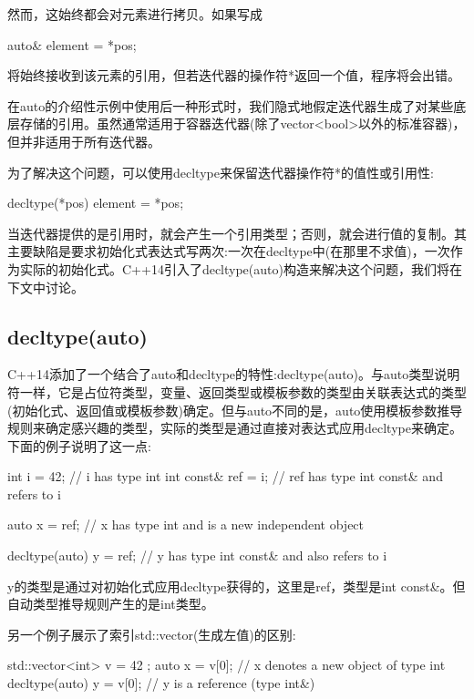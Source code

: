 然而，这始终都会对元素进行拷贝。如果写成

\begin{cpp}
auto& element = *pos;
\end{cpp}

将始终接收到该元素的引用，但若迭代器的操作符*返回一个值，程序将会出错。

\begin{notice}
在auto的介绍性示例中使用后一种形式时，我们隐式地假定迭代器生成了对某些底层存储的引用。虽然通常适用于容器迭代器(除了vector<bool>以外的标准容器)，但并非适用于所有迭代器。
\end{notice}

为了解决这个问题，可以使用decltype来保留迭代器操作符*的值性或引用性:

\begin{cpp}
decltype(*pos) element = *pos;
\end{cpp}

当迭代器提供的是引用时，就会产生一个引用类型；否则，就会进行值的复制。其主要缺陷是要求初始化式表达式写两次:一次在decltype中(在那里不求值)，一次作为实际的初始化式。C++14引入了decltype(auto)构造来解决这个问题，我们将在下文中讨论。

\subsection{decltype(auto)}

C++14添加了一个结合了auto和decltype的特性:decltype(auto)。与auto类型说明符一样，它是占位符类型，变量、返回类型或模板参数的类型由关联表达式的类型(初始化式、返回值或模板参数)确定。但与auto不同的是，auto使用模板参数推导规则来确定感兴趣的类型，实际的类型是通过直接对表达式应用decltype来确定。下面的例子说明了这一点:

\begin{cpp}
int i = 42; // i has type int
int const& ref = i; // ref has type int const& and refers to i

auto x = ref; // x has type int and is a new independent object

decltype(auto) y = ref; // y has type int const& and also refers to i
\end{cpp}

y的类型是通过对初始化式应用decltype获得的，这里是ref，类型是int const\&。但自动类型推导规则产生的是int类型。

另一个例子展示了索引std::vector(生成左值)的区别:

\begin{cpp}
std::vector<int> v = { 42 };
auto x = v[0]; // x denotes a new object of type int
decltype(auto) y = v[0]; // y is a reference (type int&)
\end{cpp}

